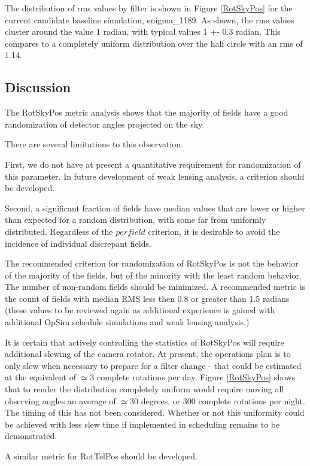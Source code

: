 The distribution of rms values by filter is shown in Figure \ref{RotSkyPos} for the current candidate baseline simulation, enigma\_1189.  As shown, the rms values cluster around the value 1 radian,  with typical values 1 +- 0.3 radian.  This compares to a completely uniform distribution over the half circle with an rms of 1.14.  

\subsection{Discussion}

The RotSkyPos metric analysis shows that the majority of fields have a good randomization of detector angles projected on the sky.

There are several limitations to this observation.

First, we do not have at present a quantitative requirement for randomization of this parameter.  In future development of weak lensing analysis, a criterion should be developed.

Second, a significant fraction of fields  have median values that are lower or higher than expected for a random distribution, with some far from uniformly distributed.  Regardless of the $per field$ criterion, it is desirable to avoid the incidence of individual discrepant fields.

The recommended criterion for randomization of RotSkyPos is not the behavior of the majority of the fields, but of the minority with the least random behavior.  The number of non-random fields should be minimized.  A recommended metric is the count of fields with median RMS less then 0.8 or greater than 1.5 radians (these values to be reviewed again as additional experience is gained with additional OpSim schedule simulations and weak lensing analysis.)

It is certain that actively controlling the statistics of RotSkyPos will require additional slewing of the camera rotator.  At present, the operations plan is to only slew when necessary to prepare for a filter change - that could be estimated at the equivalent of $\simeq 3$ complete rotations per day.  Figure \ref{RotSkyPos} shows that to render the distribution completely uniform would require moving all observing angles an average of $\simeq 30$ degrees, or 300 complete rotations per night.  The timing of this has not been considered.  Whether or not this uniformity could be achieved with less slew time if implemented in scheduling remains to be demonstrated.

A similar metric for RotTelPos should be developed. 